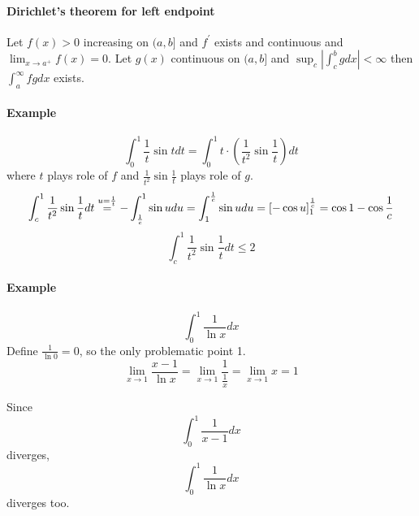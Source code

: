 \paragraph{Dirichlet's theorem for left endpoint} Let $f(x) > 0$ increasing on $(a,b]$ and $f^\prime$ exists and continuous and $\lim_{x\to a^+} f(x) = 0$. Let $g(x)$ continuous on $(a,b]$ and $\sup_c \left| \int_c^b g dx \right| < \infty$ then $\int_a^\infty fg dx$ exists.
\paragraph{Example}
$$\int_0^1 \frac{1}{t} \sin t dt = \int_0^1 t \cdot \left(\frac{1}{t^2} \sin \frac{1}{t}\right) dt $$
where $t$ plays role of $f$ and $\frac{1}{t^2} \sin \frac{1}{t}$ plays role of $g$.
$$\int_c^1 \frac{1}{t^2} \sin \frac{1}{t} dt \stackrel{\scriptsize u=\frac{1}{t}}{=} -\int_{\frac{1}{c}}^{1} \sin u du = \int_{1}^{\frac{1}{c}}\sin u du = \left[ -\cos u\right]_{1}^{\frac{1}{c}} = \cos 1 - \cos \frac{1}{c}$$
$$\int_c^1 \frac{1}{t^2} \sin \frac{1}{t} dt \leq 2$$
\paragraph{Example}
$$\int_0^1 \frac{1}{\ln x} dx$$
Define $\frac{1}{\ln 0} = 0$, so the only problematic point 1.
$$\lim_{x\to 1} \frac{x-1}{\ln x} = \lim_{x\to 1} \frac{1}{\frac{1}{x}} = \lim_{x\to 1} x = 1$$

Since $$\int_0^1 \frac{1}{x-1} dx$$ diverges, $$\int_0^1 \frac{1}{\ln x} dx$$ diverges too.